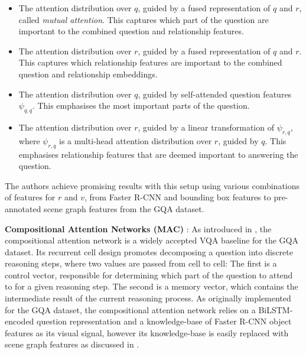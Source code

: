 \begin{itemize}
    \item The attention distribution over \(q\), guided by a fused representation of \(q\) and \(r\), called \textit{mutual attention}. This captures which part of the question are important to the combined question and relationship features.
    \item The attention distribution over \(r\), guided by a fused representation of \(q\) and \(r\). This captures which relationship features are important to the combined question and relationship embeddings.
    \item The attention distribution over \(q\), guided by self-attended question features \(\psi_{q, q}\). This emphasises the most important parts of the question.
    \item The attention distribution over \(r\), guided by a linear transformation of \(\psi_{r, q}\), where \(\psi_{r, q}\) is a multi-head attention distribution over \(r\), guided by \(q\). This emphasises relationship features that are deemed important to answering the question.
\end{itemize}

The authors achieve promising results with this setup using various combinations of features for \(r\) and \(v\), from Faster R-CNN and bounding box features to pre-annotated scene graph features from the GQA dataset.

\textbf{Compositional Attention Networks (MAC)} \cite{hudson2018compositional}: As introduced in \subsectionautorefname{ \ref{subsection:attention_methods_for_vqa}}, the compositional attention network is a widely accepted VQA baseline for the GQA dataset. Its recurrent cell design promotes decomposing a question into discrete reasoning steps, where two values are passed from cell to cell: The first is a control vector, responsible for determining which part of the question to attend to for a given reasoning step. The second is a memory vector, which contains the intermediate result of the current reasoning process. As originally implemented for the GQA dataset, the compositional attention network relies on a BiLSTM-encoded question representation and a knowledge-base of Faster R-CNN \cite{ren2016faster} object features as its visual signal, however its knowledge-base is easily replaced with scene graph features as discussed in \sectionautorefname{ \ref{section:performance_evaluation}}.

